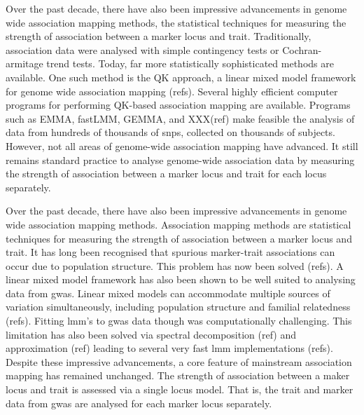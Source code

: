 \documentclass{article}
\begin{document}
Over the past decade, there have also been impressive advancements in genome wide association mapping methods, the statistical techniques for measuring the strength of association between a marker locus and trait. Traditionally, association data were analysed with simple contingency tests or Cochran-armitage  trend tests. Today, far more statistically sophisticated methods are available. One such method is the  QK approach, a linear mixed model framework for genome wide association mapping (refs).  Several highly efficient 
computer programs for performing QK-based association mapping are available. Programs such as EMMA, fastLMM, GEMMA, and 
XXX(ref) make feasible the analysis of data from hundreds of thousands of snps, collected on thousands of subjects. However, not all 
areas of genome-wide association mapping have advanced. It still remains standard practice to analyse genome-wide association data 
by measuring the strength of association between a marker locus and trait for each locus separately. 




Over the past decade, there have also been impressive advancements in genome wide association mapping methods. Association mapping methods are statistical techniques for measuring the strength of association between a marker locus and trait. It has long been recognised that spurious marker-trait associations can occur due to population structure. This problem has now been solved (refs). A linear mixed model framework has also been shown to be well suited to analysing data from gwas. Linear mixed models can accommodate multiple sources of variation simultaneously, including population structure and familial relatedness (refs). Fitting lmm's to gwas data though was computationally challenging. This limitation has also been solved via spectral decomposition (ref) and approximation (ref) leading to several very fast lmm implementations (refs). Despite these impressive advancements, a core feature of mainstream  association mapping has remained unchanged. The strength of association between a maker locus and trait is assessed via a single locus model.  That is, the trait and marker data from gwas are analysed for each marker locus separately.
\end{document}

